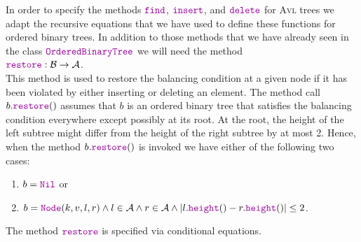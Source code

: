 In order to specify the methods \emph{$\mytt{find}$}, \emph{$\mytt{insert}$}, and \emph{$\mytt{delete}$} for \textsc{Avl} trees we
adapt the recursive equations that we have used to define these functions for ordered binary trees.
In addition to those methods that we have already seen in the class $\mytt{OrderedBinaryTree}$ we will need the method
\\[0.2cm]
\hspace*{1.3cm} $\mytt{restore}: \Bin \rightarrow \AVL$. 
\\[0.2cm]
This method is used to restore the balancing condition at a given node if it has been violated by
either inserting or deleting an element.
The method call $b.\mytt{restore}()$ assumes that  $b$ is an ordered binary tree that satisfies
the balancing condition everywhere except possibly at its root. 
At the root, the height of the left subtree might differ from the height of the right subtree by at
most 2.  Hence, when the method $b.\mytt{restore}()$ is invoked we have either of the following
two cases:
\begin{enumerate}
\item $b = \mytt{Nil}$ \quad or
\item $b = \mytt{Node}(k,v,l,r) \wedge l \in \AVL \wedge r \in \AVL \wedge
       |l.\mytt{height}() - r.\mytt{height}()| \leq 2$.
\end{enumerate}
The method $\mytt{restore}$ is specified via conditional equations.
